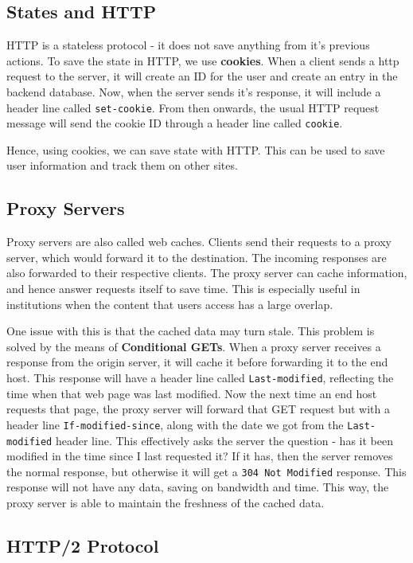 \documentclass[12pt,letterpaper]{amsbook}
\theoremstyle{definition}
\begin{document}
\subsection{States and HTTP}

HTTP is a stateless protocol - it does not save anything from it's previous actions. To save the state in HTTP, we use \textbf{cookies}. When a client sends a http request to the server, it will create an ID for the user and create an entry in the backend database. Now, when the server sends it's response, it will include a header line called \texttt{set-cookie}. From then onwards, the usual HTTP request message will send the cookie ID through a header line called \texttt{cookie}.

Hence, using cookies, we can save state with HTTP. This can be used to save user information and track them on other sites.

\subsection{Proxy Servers}

Proxy servers are also called web caches. Clients send their requests to a proxy server, which would forward it to the destination. The incoming responses are also forwarded to their respective clients. The proxy server can cache information, and hence answer requests itself to save time. This is especially useful in institutions when the content that users access has a large overlap.

One issue with this is that the cached data may turn stale. This problem is solved by the means of \textbf{Conditional GETs}. When a proxy server receives a response from the origin server, it will cache it before forwarding it to the end host. This response will have a header line called \texttt{Last-modified}, reflecting the time when that web page was last modified. Now the next time an end host requests that page, the proxy server will forward that GET request but with a header line \texttt{If-modified-since}, along with the date we got from the \texttt{Last-modified} header line. This effectively asks the server the question - has it been modified in the time since I last requested it? If it has, then the server removes the normal response, but otherwise it will get a \texttt{304 Not Modified} response. This response will not have any data, saving on bandwidth and time. This way, the proxy server is able to maintain the freshness of the cached data.

\subsection{HTTP/2 Protocol}
\end{document}
